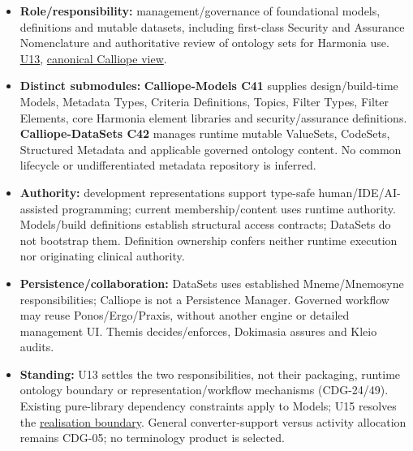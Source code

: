 \begin{itemize}


\item \textbf{Role/responsibility:} management/governance of foundational models, definitions
  and mutable datasets, including first-class Security and Assurance Nomenclature
  and authoritative review of ontology sets for Harmonia use. \href{\detokenize{../../../../../docs/markdown/05-information-systems-architecture/sources.md#u13}}{U13},
  \href{\detokenize{../../../../../docs/markdown/05-information-systems-architecture/calliope-models-and-datasets.md}}{canonical Calliope view}.

\item \textbf{Distinct submodules:} \textbf{Calliope-Models C41} supplies design/build-time
  Models, Metadata Types, Criteria Definitions, Topics, Filter Types, Filter Elements,
  core Harmonia element libraries and security/assurance definitions.
  \textbf{Calliope-DataSets C42} manages runtime mutable ValueSets, CodeSets, Structured
  Metadata and applicable governed ontology content. No common lifecycle or
  undifferentiated metadata repository is inferred.

\item \textbf{Authority:} development representations support type-safe human/IDE/AI-assisted
  programming; current membership/content uses runtime authority. Models/build
  definitions establish structural access contracts; DataSets do not bootstrap them.
  Definition ownership confers neither runtime execution nor originating clinical authority.

\item \textbf{Persistence/collaboration:} DataSets uses established Mneme/Mnemosyne
  responsibilities; Calliope is not a Persistence Manager. Governed workflow may
  reuse Ponos/Ergo/Praxis, without another engine or detailed management UI.
  Themis decides/enforces, Dokimasia assures and Kleio audits.

\item \textbf{Standing:} U13 settles the two responsibilities, not their packaging, runtime
  ontology boundary or representation/workflow mechanisms (CDG-24/49). Existing
  pure-library dependency constraints apply to Models; U15 resolves the
  \href{\detokenize{../../../../../docs/markdown/05-information-systems-architecture/calliope-models-and-datasets.md#calliope-realisation}}{realisation boundary}.
  General converter-support
  versus activity allocation remains CDG-05; no terminology product is selected.

\end{itemize}






